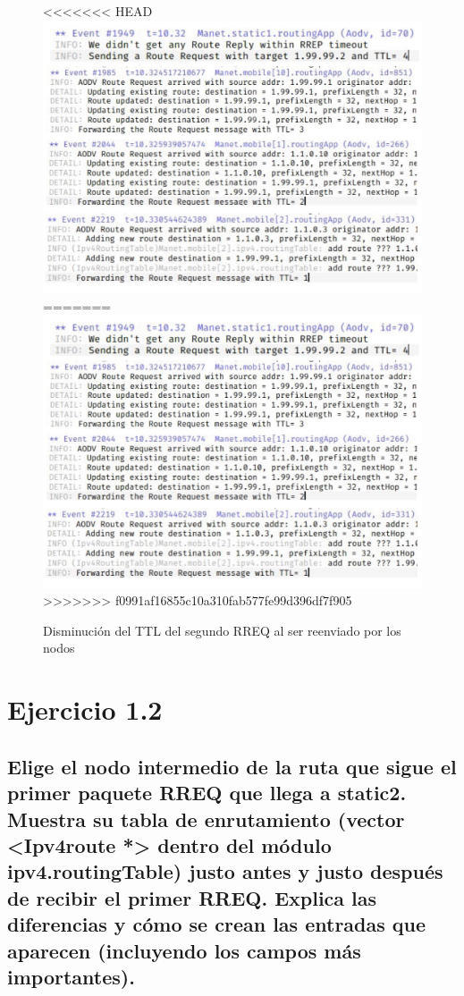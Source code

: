 \begin{figure}[H]
    \centering
<<<<<<< HEAD
    \includegraphics[width=125mm, scale=0.75]{imaxes/ejercicio1_4.jpg}
=======
    \includegraphics[width=125mm, scale=0.75]{imaxes/aodv/ejercicio1_4.jpg}
>>>>>>> f0991af16855c10a310fab577fe99d396df7f905
    \caption{Disminución del TTL del segundo RREQ al ser reenviado por los nodos}
    \label{fig:ttldisminucion}
\end{figure}

\vspace{1.25cm}
\section{Ejercicio 1.2}

\subsection{Elige el nodo intermedio de la ruta que sigue el primer paquete RREQ que llega a static2. Muestra su tabla
de enrutamiento (vector <Ipv4route *> dentro del módulo ipv4.routingTable) justo antes y justo después de
recibir el primer RREQ. Explica las diferencias y cómo se crean las entradas que aparecen (incluyendo los campos
más importantes).}

